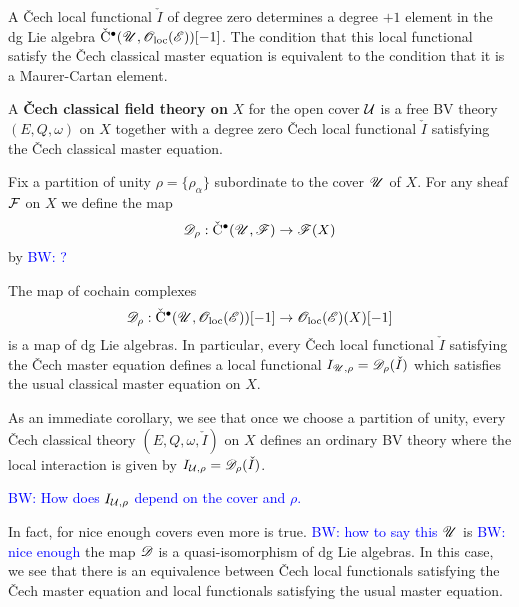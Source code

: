 \documentclass[11pt]{amsart}
\numberwithin{equation}{section}
\def\brian{\textcolor{blue}{BW: }\textcolor{blue}}
\def\vC{{\rm\check{C}}}
\def\vI{\check{I}}
\begin{document}
A \v{C}ech local functional $\vI$ of degree zero determines a degree $+1$ element in the dg Lie algebra $\vC^\bu(\sU, \oloc(\sE))[-1]$. 
The condition that this local functional satisfy the \v{C}ech classical master equation is equivalent to the condition that it is a Maurer-Cartan element. 

\begin{dfn}
A {\bf \v{C}ech classical field theory on} $X$ for the open cover $\mathcal U$ is a free BV theory $(E, Q, \omega)$ on $X$ together with a degree zero \v{C}ech local functional $\vI$ satisfying the \v{C}ech classical master equation. 
\end{dfn}

Fix a partition of unity $\rho = \{\rho_\alpha\}$ subordinate to the cover $\mathscr U$ of $X$. 
For any sheaf $\mathcal F$ on $X$ we define the map
\[
\sD_{\rho} : \vC^\bu(\sU , \sF) \to \sF(X) 
\]
by \brian{?}

\begin{lem}
The map of cochain complexes
\[
\sD_{\rho} : \vC^\bu(\sU, \oloc(\sE))[-1] \to \oloc(\sE)(X)[-1]
\]
is a map of dg Lie algebras. 
In particular, every \v{C}ech local functional $\vI$ satisfying the \v{C}ech master equation defines a local functional $I_{\sU, \rho} = \sD_\rho(\vI)$ which satisfies the usual classical master equation on $X$. 
\end{lem}

As an immediate corollary, we see that once we choose a partition of unity, every \v{C}ech classical theory $(E, Q, \omega, \vI)$ on $X$ defines an ordinary BV theory where the local interaction is given by $I_{\cU, \rho} = \sD_{\rho} (\vI)$. 

\begin{lem}
\brian{How does $I_{\mathcal U,\rho}$ depend on the cover and $\rho$.}
\end{lem}

In fact, for nice enough covers even more is true.
\brian{how to say this} $\mathscr U$ is \brian{nice enough} the map $\mathscr D$ is a quasi-isomorphism of dg Lie algebras.
In this case, we see that there is an equivalence between \v{C}ech local functionals satisfying the \v{C}ech master equation and local functionals satisfying the usual master equation. 
\end{document}
